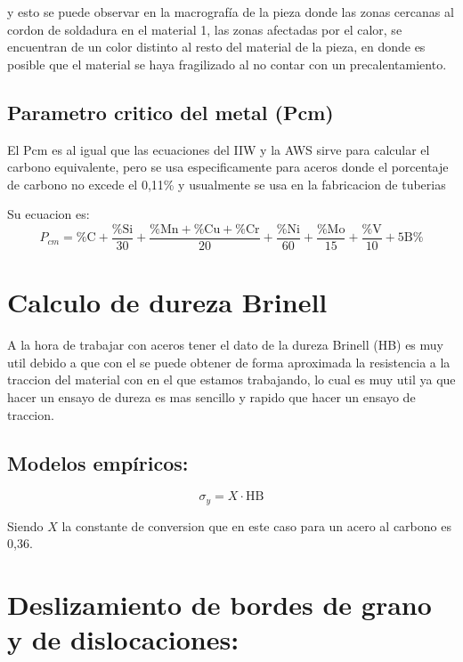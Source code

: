 \documentclass[12pt,a4paper]{article}
\begin{document}
y esto se puede observar en la macrografía de la pieza donde las zonas cercanas al cordon de soldadura en el material 1, las zonas afectadas por el calor, se encuentran de un color distinto al resto del material de la pieza, en donde es posible que el material se haya fragilizado al no contar con un precalentamiento.

\subsection{Parametro critico del metal (Pcm)}
El Pcm es al igual que las ecuaciones del IIW y la AWS sirve para calcular el carbono equivalente, pero se usa especificamente para aceros donde el porcentaje de carbono no excede el 0,11\% y usualmente se usa en la fabricacion de tuberias

Su ecuacion es:
\begin{equation}
    P_{cm} = \text{\%C} + \frac{\text{\%Si}}{30} + \frac{\text{\%Mn}+\text{\%Cu}+\text{\%Cr}}{20} + \frac{\text{\%Ni}}{60} + \frac{\text{\%Mo}}{15} + \frac{\text{\%V}}{10} + \text{5B\%}
\end{equation}

\section{Calculo de dureza Brinell}

A la hora de trabajar con aceros tener el dato de la dureza Brinell (HB) es muy util debido a que con el se puede obtener de forma aproximada la resistencia a la traccion del material con en el que estamos trabajando, 
lo cual es muy util ya que hacer un ensayo de dureza es mas sencillo y rapido que hacer un ensayo de traccion.

\subsection{Modelos empíricos:}

\begin{equation}
    \sigma_y = X \cdot \text{HB}
\end{equation}

Siendo $X$ la constante de conversion que en este caso para un acero al carbono es 0,36.


\section{Deslizamiento de bordes de grano y de dislocaciones: }
\end{document}
